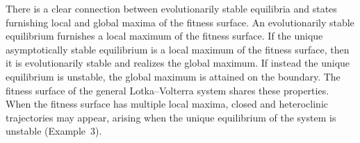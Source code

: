 \documentclass[12pt]{report}
\theoremstyle{definition}
\theoremstyle{remark}
\begin{document}
There is a clear connection between evolutionarily stable equilibria and states furnishing local and global maxima of the fitness surface. An evolutionarily stable equilibrium furnishes a local maximum of the fitness surface. If the unique asymptotically stable equilibrium is a local maximum of the fitness surface, then it is evolutionarily stable and realizes the global maximum. If instead the unique equilibrium is unstable, the global maximum is attained on the boundary. The fitness surface of the general Lotka--Volterra system shares these properties. When the fitness surface has multiple local maxima, closed and heteroclinic trajectories may appear, arising when the unique equilibrium of the system is unstable (Example~3).





\end{document}
